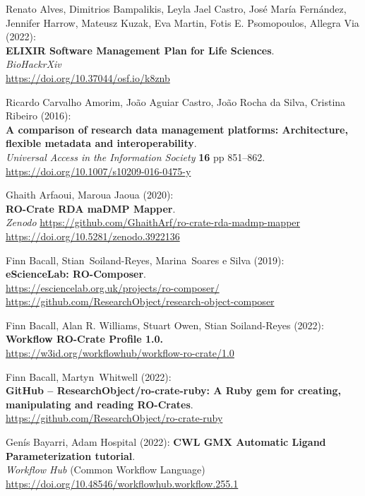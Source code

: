 \begin{thebibliography}{9}
Renato Alves, Dimitrios Bampalikis, Leyla Jael Castro,
José María Fernández, Jennifer Harrow, Mateusz Kuzak, Eva Martin, Fotis
E. Psomopoulos, Allegra Via (2022):\\
\textbf{ELIXIR Software Management Plan for Life Sciences}.\\
\emph{BioHackrXiv}\\
\url{https://doi.org/10.37044/osf.io/k8znb}

Ricardo Carvalho Amorim, João Aguiar Castro, João Rocha da
Silva, Cristina Ribeiro (2016):\\
\textbf{A comparison of research data management platforms:
Architecture, flexible metadata and interoperability}.\\
\emph{Universal Access in the Information Society} \textbf{16} pp
851--862.\\
\url{https://doi.org/10.1007/s10209-016-0475-y}

Ghaith Arfaoui, Maroua Jaoua (2020):\\
\textbf{RO-Crate RDA maDMP Mapper}.\\
\emph{Zenodo}
\url{https://github.com/GhaithArf/ro-crate-rda-madmp-mapper}\\
\url{https://doi.org/10.5281/zenodo.3922136}

Finn Bacall, Stian~Soiland-Reyes, Marina~Soares e Silva
(2019):\\
\textbf{eScienceLab: RO-Composer}.\\
\url{https://esciencelab.org.uk/projects/ro-composer/}\\
\url{https://github.com/ResearchObject/research-object-composer}

Finn Bacall, Alan R. Williams, Stuart Owen, Stian
Soiland-Reyes (2022):\\
\textbf{Workflow RO-Crate Profile 1.0.}\\
\url{https://w3id.org/workflowhub/workflow-ro-crate/1.0}

Finn Bacall, Martyn~Whitwell (2022):\\
\textbf{GitHub -- ResearchObject/ro-crate-ruby: A Ruby gem for creating,
manipulating and reading RO-Crates}.\\
\url{https://github.com/ResearchObject/ro-crate-ruby}

Genís Bayarri, Adam Hospital (2022): \textbf{CWL GMX
Automatic Ligand Parameterization tutorial}.\\
\emph{Workflow Hub} (Common Workflow Language)\\
\url{https://doi.org/10.48546/workflowhub.workflow.255.1}


\end{thebibliography}
